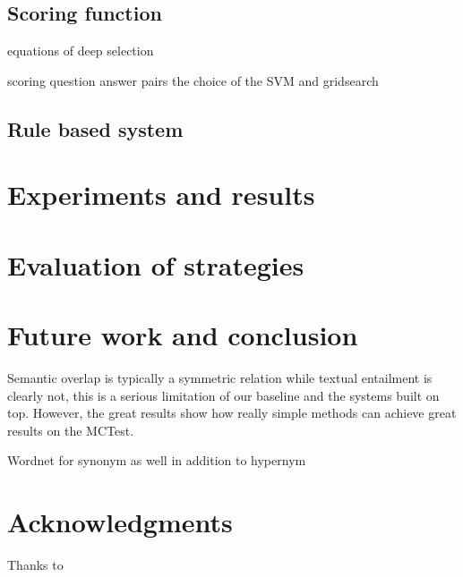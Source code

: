 \documentclass[11pt]{article}
\begin{document}
\subsection{Scoring function}
equations of deep selection

scoring question answer pairs
the choice of the SVM and gridsearch
\label{sec:bigmix}

\subsection{Rule based system}
\label{sec:rulebased}

\section{Experiments and results}

\section{Evaluation of strategies}

\section{Future work and conclusion}

Semantic overlap is typically a symmetric relation while textual entailment is clearly not, this is a serious limitation of our baseline and the systems built on top.
However, the great results show how really simple methods can achieve great results on the MCTest.

Wordnet for synonym as well in addition to hypernym

\section*{Acknowledgments}
Thanks to



\end{document}
